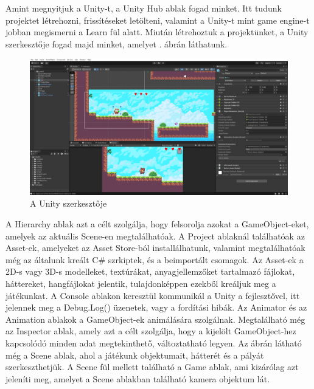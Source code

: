 
Amint megnyitjuk a Unity-t, a Unity Hub ablak fogad minket. Itt tudunk projektet létrehozni, frissítéseket letölteni, valamint a Unity-t mint game engine-t jobban megismerni a Learn fül alatt. Miután létrehoztuk a projektünket, a Unity szerkesztője fogad majd minket, amelyet . ábrán láthatunk.

\begin{figure}[ht]
\centering
\includegraphics[width=\linewidth]{images/unityszerkeszto.png}
\caption{A Unity szerkesztője}
\label{fig:unityszerkeszto}
\end{figure}

A Hierarchy ablak azt a célt szolgálja, hogy felsorolja azokat a GameObject-eket, amelyek az aktuális Scene-en megtalálhatóak. A Project ablaknál találhatóak az Asset-ek, amelyeket az Asset Store-ból installálhatunk, valamint megtalálhatóak még az általunk kreált C\# szrkiptek, és a beimportált csomagok. Az Asset-ek a 2D-s vagy 3D-s modelleket, textúrákat, anyagjellemzőket tartalmazó fájlokat, háttereket, hangfájlokat jelentik, tulajdonképpen ezekből kreáljuk meg a játékunkat. A Console ablakon keresztül kommunikál a Unity a fejlesztővel, itt jelennek meg a Debug.Log() üzenetek, vagy a fordítási hibák. Az Animator és az Animation ablakok a GameObject-ek animálására szolgálnak. Megtalálható még az Inspector ablak, amely azt a célt szolgálja, hogy a kijelölt GameObject-hez kapcsolódó minden adat megtekinthető, változtatható legyen. Az ábrán látható még a Scene ablak, ahol a játékunk objektumait, hátterét és a pályát szerkeszthetjük. A Scene fül mellett található a Game ablak, ami kizárólag azt jeleníti meg, amelyet a Scene ablakban található kamera objektum lát.


